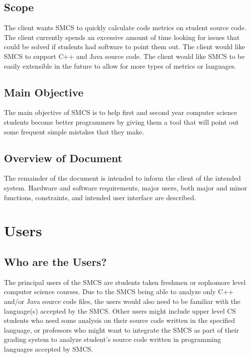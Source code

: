 \documentclass{scrreprt}
\begin{document}
	\section{Scope}
	The client wants SMCS to quickly calculate code metrics on student source code. The client currently spends an excessive amount of time looking for issues that could be solved if students had software to point them out. The client would like SMCS to support C++ and Java source code. The client would like SMCS to be easily extensible in the future to allow for more types of metrics or languages.
	\section{Main Objective}
	The main objective of SMCS is to help first and second year computer science students become better programmers by giving them a tool that will point out some frequent simple mistakes that they make.
	\section{Overview of Document}
	The remainder of the document is intended to inform the client of the intended system. Hardware and software requirements, major users, both major and minor functions, constraints, and intended user interface are described.
	\chapter{Users}
	\section{Who are the Users?}
	The principal users of the SMCS are students taken freshmen or sophomore level computer science courses. Due to the SMCS being able to analyze only C++ and/or Java source code files, the users would also need to be familiar with the language(s) accepted by the SMCS. Other users might include upper level CS students who need some analysis on their source code written in the specified language, or professors who might want to integrate the SMCS as part of their grading system to analyze student’s source code written in programming languages accepted by SMCS.
\end{document}
